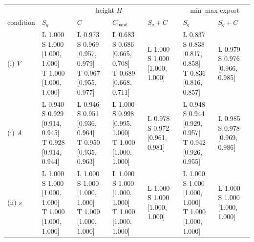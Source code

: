 \begin{tabular}{lllllll}
\toprule
 & \multicolumn{4}{c}{height $H$} & \multicolumn{2}{c}{min--max export} \\
\cmidrule(lr){2-5}\cmidrule(lr){6-7}
condition & $S_q$ & $C$ & $C_{\mathrm{band}}$ & $S_q{+}C$ & $S_q$ & $S_q{+}C$ \\
\midrule
(i) $V$ & \makecell[l]{L 1.000\\ S 1.000 [1.000, 1.000]\\ T 1.000 [1.000, 1.000]} & \makecell[l]{L 0.973\\ S 0.969 [0.957, 0.979]\\ T 0.967 [0.955, 0.977]} & \makecell[l]{L 0.683\\ S 0.686 [0.665, 0.708]\\ T 0.689 [0.668, 0.711]} & \makecell[l]{L 1.000\\ S 1.000 [1.000, 1.000]} & \makecell[l]{L 0.837\\ S 0.838 [0.817, 0.858]\\ T 0.836 [0.816, 0.857]} & \makecell[l]{L 0.979\\ S 0.976 [0.966, 0.985]} \\
\addlinespace
(i) $A$ & \makecell[l]{L 0.940\\ S 0.929 [0.914, 0.945]\\ T 0.928 [0.914, 0.944]} & \makecell[l]{L 0.946\\ S 0.951 [0.936, 0.964]\\ T 0.950 [0.935, 0.963]} & \makecell[l]{L 1.000\\ S 0.998 [0.995, 1.000]\\ T 1.000 [1.000, 1.000]} & \makecell[l]{L 0.978\\ S 0.972 [0.961, 0.981]} & \makecell[l]{L 0.948\\ S 0.944 [0.929, 0.957]\\ T 0.942 [0.926, 0.955]} & \makecell[l]{L 0.985\\ S 0.978 [0.969, 0.986]} \\
\addlinespace
(ii) $s$ & \makecell[l]{L 1.000\\ S 1.000 [1.000, 1.000]\\ T 1.000 [1.000, 1.000]} & \makecell[l]{L 1.000\\ S 1.000 [1.000, 1.000]\\ T 1.000 [1.000, 1.000]} & \makecell[l]{L 1.000\\ S 1.000 [1.000, 1.000]\\ T 1.000 [1.000, 1.000]} & \makecell[l]{L 1.000\\ S 1.000 [1.000, 1.000]} & \makecell[l]{L 1.000\\ S 1.000 [1.000, 1.000]\\ T 1.000 [1.000, 1.000]} & \makecell[l]{L 1.000\\ S 1.000 [1.000, 1.000]} \\

\end{tabular}
